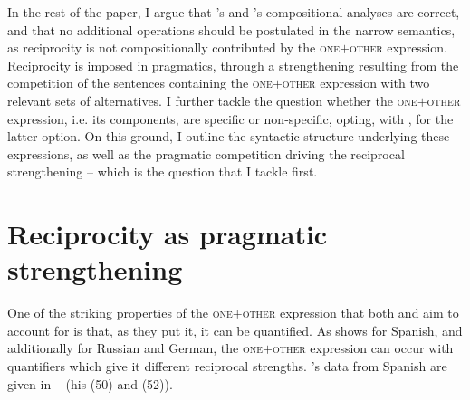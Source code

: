 \documentclass[output=paper,colorlinks,citecolor=brown]{langscibook}
\begin{document}
In the rest of the paper, I argue that \citeauthor{v10}'s %
and \citeauthor{z14}'s %
compositional analyses are correct, and that no additional operations should be postulated in the narrow semantics, as reciprocity is not compositionally contributed by the \textsc{one$+$other} expression. Reciprocity is imposed in pragmatics, through a strengthening resulting from the competition of the sentences containing the \textsc{one$+$other} expression with two relevant sets of alternatives. I further tackle the question whether the \textsc{one$+$other} expression, i.e. its components, are specific or non-specific, opting, with \citeauthor{v10}%
, for the latter option. On this ground, I outline the syntactic structure underlying these expressions, as well as the pragmatic competition driving the reciprocal strengthening -- which is the question that I tackle first.

\section{Reciprocity as pragmatic strengthening}\label{sec:arsenijevic:3}

One of the striking properties of the \textsc{one$+$other} expression that both \citet{z14} and \citet{v10} %
aim to account for is that, as they put it, it can be quantified. As \citeauthor{v10} %
shows for Spanish, and \citeauthor{z14} %
additionally for Russian and German, the \textsc{one$+$other} expression can occur with quantifiers which give it different reciprocal strengths. \citeauthor{v10}'s data from Spanish are given in -- (his (50) and (52)).

\ea\label{ex:arsenijevic:Todos}
\label{ex:arsenijevic:Todos-a}

\label{ex:arsenijevic:Todos-b}

\label{ex:arsenijevic:Todos-c}
 \z \z
\end{document}
